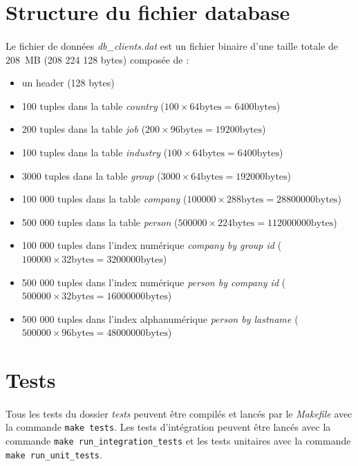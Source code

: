 \documentclass{article}
\begin{document}
    \section{Structure du fichier database}
    \paragraph{}
    Le fichier de données \emph{db\_clients.dat} est un fichier binaire d'une taille totale de 208 MB (208 224 128  bytes) composée de :
    \begin{itemize}[label=$\bullet$]
        \item un header (128 bytes)
        \item 100 tuples dans la table \emph{country} ($100 \times 64 \text{bytes} = 6400 \text{bytes}$)
        \item 200 tuples dans la table \emph{job} ($200 \times 96 \text{bytes} = 19200 \text{bytes}$)
        \item 100 tuples dans la table \emph{industry} ($100 \times 64 \text{bytes} = 6400 \text{bytes}$)
        \item 3000 tuples dans la table \emph{group} ($3000 \times 64 \text{bytes} = 192000 \text{bytes}$)
        \item 100 000 tuples dans la table \emph{company} ($100000 \times 288 \text{bytes} = 28800000 \text{bytes}$)
        \item 500 000 tuples dans la table \emph{person} ($500000 \times 224 \text{bytes} = 112000000 \text{bytes}$)
        \item 100 000 tuples dans l'index numérique \emph{company by group id} ($100000 \times 32 \text{bytes} = 3200000 \text{bytes}$)
        \item 500 000 tuples dans l'index numérique \emph{person by company id} ($500000 \times 32 \text{bytes} = 16000000 \text{bytes}$)
        \item 500 000 tuples dans l'index alphanumérique \emph{person by lastname} ($500000 \times 96 \text{bytes} = 48000000 \text{bytes}$)
    \end{itemize}



    \newpage
    \section{Tests}
    \paragraph{}
    Tous les tests du dossier \emph{tests} peuvent être compilés et lancés par le \emph{Makefile} avec la commande \texttt{make tests}. Les tests d'intégration peuvent être lancés avec la commande \texttt{make run\_integration\_tests} et les tests unitaires avec la commande \texttt{make run\_unit\_tests}.
\end{document}
